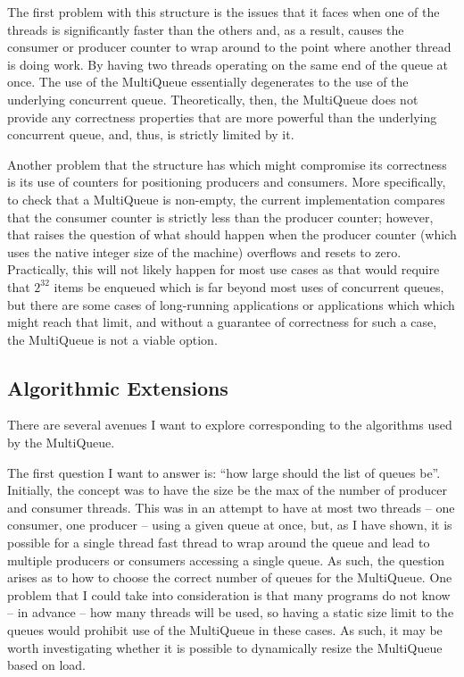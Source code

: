\documentclass[12pt]{report}
\begin{document}
The first problem with this structure is the issues that it faces when one of
the threads is significantly faster than the others and, as a result, causes
the consumer or producer counter to wrap around to the point where another
thread is doing work. By having two threads operating on the same end of the
queue at once. The use of the MultiQueue essentially degenerates to the use of
the underlying concurrent queue. Theoretically, then, the MultiQueue does not
provide any correctness properties that are more powerful than the underlying
concurrent queue, and, thus, is strictly limited by it.

Another problem that the structure has which might compromise its correctness
is its use of counters for positioning producers and consumers. More
specifically, to check that a MultiQueue is non-empty, the current
implementation compares that the consumer counter is strictly less than the
producer counter; however, that raises the question of what should happen when
the producer counter (which uses the native integer size of the machine)
overflows and resets to zero. Practically, this will not likely happen for most
use cases as that would require that $2^{32}$ items be enqueued which is far
beyond most uses of concurrent queues, but there are some cases of long-running
applications or applications which which might reach that limit, and without a
guarantee of correctness for such a case, the MultiQueue is not a viable
option.


\subsection{Algorithmic Extensions}
There are several avenues I want to explore corresponding to the algorithms
used by the MultiQueue.

The first question I want to answer is: ``how large should the list of queues
be''. Initially, the concept was to have the size be the max of the number of
producer and consumer threads. This was in an attempt to have at most two
threads -- one consumer, one producer -- using a given queue at once, but, as I
have shown, it is possible for a single thread fast thread to wrap around the
queue and lead to multiple producers or consumers accessing a single queue. As
such, the question arises as to how to choose the correct number of queues for
the MultiQueue. One problem that I could take into consideration is that many
programs do not know -- in advance -- how many threads will be used, so having
a static size limit to the queues would prohibit use of the MultiQueue in these
cases. As such, it may be worth investigating whether it is possible to
dynamically resize the MultiQueue based on load.
\end{document}
